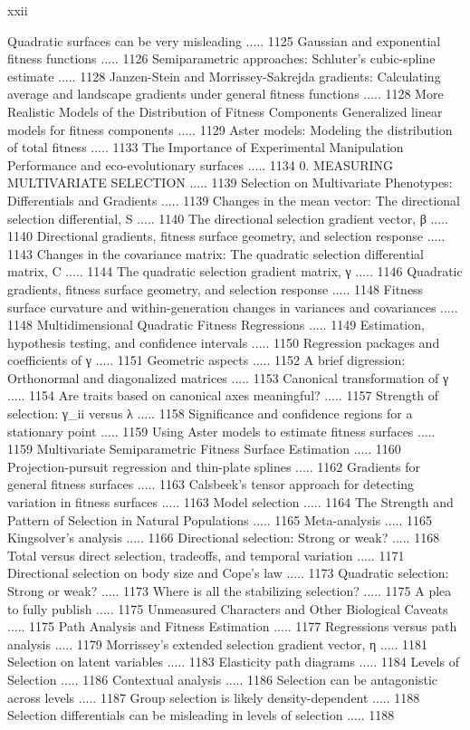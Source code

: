 \documentclass{article}
\begin{document}
xxii

Quadratic surfaces can be very misleading ..... 1125
Gaussian and exponential fitness functions ..... 1126
Semiparametric approaches: Schluter's cubic-spline estimate ..... 1128
Janzen-Stein and Morrissey-Sakrejda gradients: Calculating average and landscape gradients under general fitness functions ..... 1128
More Realistic Models of the Distribution of Fitness Components Generalized linear models for fitness components ..... 1129
Aster models: Modeling the distribution of total fitness ..... 1133
The Importance of Experimental Manipulation Performance and eco-evolutionary surfaces ..... 1134
0. MEASURING MULTIVARIATE SELECTION ..... 1139
Selection on Multivariate Phenotypes: Differentials and Gradients ..... 1139
Changes in the mean vector: The directional selection differential, S ..... 1140
The directional selection gradient vector, β ..... 1140
Directional gradients, fitness surface geometry, and selection response ..... 1143
Changes in the covariance matrix: The quadratic selection differential matrix, C ..... 1144
The quadratic selection gradient matrix, γ ..... 1146
Quadratic gradients, fitness surface geometry, and selection response ..... 1148
Fitness surface curvature and within-generation changes in variances and covariances ..... 1148
Multidimensional Quadratic Fitness Regressions ..... 1149
Estimation, hypothesis testing, and confidence intervals ..... 1150
Regression packages and coefficients of γ ..... 1151
Geometric aspects ..... 1152
A brief digression: Orthonormal and diagonalized matrices ..... 1153
Canonical transformation of γ ..... 1154
Are traits based on canonical axes meaningful? ..... 1157
Strength of selection: γ_{ii} versus λ ..... 1158
Significance and confidence regions for a stationary point ..... 1159
Using Aster models to estimate fitness surfaces ..... 1159
Multivariate Semiparametric Fitness Surface Estimation ..... 1160
Projection-pursuit regression and thin-plate splines ..... 1162
Gradients for general fitness surfaces ..... 1163
Calsbeek's tensor approach for detecting variation in fitness surfaces ..... 1163
Model selection ..... 1164
The Strength and Pattern of Selection in Natural Populations ..... 1165
Meta-analysis ..... 1165
Kingsolver's analysis ..... 1166
Directional selection: Strong or weak? ..... 1168
Total versus direct selection, tradeoffs, and temporal variation ..... 1171
Directional selection on body size and Cope's law ..... 1173
Quadratic selection: Strong or weak? ..... 1173
Where is all the stabilizing selection? ..... 1175
A plea to fully publish ..... 1175
Unmeasured Characters and Other Biological Caveats ..... 1175
Path Analysis and Fitness Estimation ..... 1177
Regressions versus path analysis ..... 1179
Morrissey's extended selection gradient vector, η ..... 1181
Selection on latent variables ..... 1183
Elasticity path diagrams ..... 1184
Levels of Selection ..... 1186
Contextual analysis ..... 1186
Selection can be antagonistic across levels ..... 1187
Group selection is likely density-dependent ..... 1188
Selection differentials can be misleading in levels of selection ..... 1188
\end{document}
